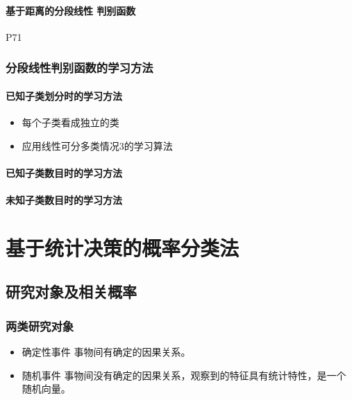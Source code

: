 \documentclass[11pt]{book}
\begin{document}
\subsubsection{基于距离的分段线性
判别函数}%
\label{ssub:ji_yu_ju_chi_de_fen_duan_xian_xing_pan_bie_han_shu_}

P71

\subsection{分段线性判别函数的学习方法}

\subsubsection{已知子类划分时的学习方法}%

\begin{itemize}
	\item 每个子类看成独立的类
	\item 应用线性可分多类情况3的学习算法
\end{itemize}
\subsubsection{已知子类数目时的学习方法}%
\label{ssub:yi_zhi_zi_lei_shu_mu_shi_de_xue_xi_fang_fa_}

\subsubsection{未知子类数目时的学习方法}%
\label{ssub:wei_zhi_zi_lei_shu_mu_shi_de_xue_xi_fang_fa_}



\chapter{基于统计决策的概率分类法}


\label{ssub:yi_zhi_zi_lei_hua_fen_shi_de_xue_xi_fang_fa_}

\section{研究对象及相关概率}

\subsection{两类研究对象}

\begin{itemize}
	\item 确定性事件 事物间有确定的因果关系。
	\item 随机事件 事物间没有确定的因果关系，观察到的特征具有统计特性，是一个随机向量。
\end{itemize}
\end{document}
